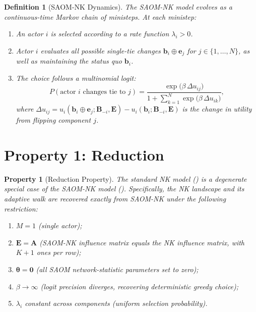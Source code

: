 \documentclass[12pt]{article}
\newtheorem{property}{Property}
\newtheorem{definition}{Definition}
\newcommand{\bb}{\mathbf{b}}
\newcommand{\be}{\mathbf{e}}
\newcommand{\bB}{\mathbf{B}}
\newcommand{\bA}{\mathbf{A}}
\newcommand{\bE}{\mathbf{E}}
\newcommand{\btheta}{\boldsymbol{\theta}}
\begin{document}
\begin{definition}[SAOM-NK Dynamics]
\label{def:saomnk_dynamics}
The SAOM-NK model evolves as a continuous-time Markov chain of \emph{ministeps}.
At each ministep:
\begin{enumerate}[label=(\roman*)]
  \item An actor $i$ is selected according to a rate function $\lambda_i > 0$.
  \item Actor $i$ evaluates all possible single-tie changes
        $\bb_i \oplus \be_j$ for $j \in \{1,\ldots,N\}$, as well as maintaining
        the status quo $\bb_i$.
  \item The choice follows a multinomial logit:
        \begin{equation}
        \label{eq:logit_choice}
          P(\text{actor } i \text{ changes tie to } j)
          = \frac{\exp\!\bigl(\beta\, \Delta u_{ij}\bigr)}
                 {\displaystyle 1 + \sum_{k=1}^{N}
                  \exp\!\bigl(\beta\, \Delta u_{ik}\bigr)},
        \end{equation}
        where $\Delta u_{ij} = u_i(\bb_i \oplus \be_j; \bB_{-i}, \bE) -
        u_i(\bb_i; \bB_{-i}, \bE)$ is the change in utility from flipping
        component $j$.
\end{enumerate}
\end{definition}

\section{Property 1: Reduction}
\label{sec:reduction}

\begin{property}[Reduction Property]
\label{property:reduction}
The standard NK model \emph{(}\emph{)} is a degenerate
special case of the SAOM-NK model \emph{(}\emph{)}. Specifically, the NK landscape and its adaptive
walk are recovered exactly from SAOM-NK under the following restriction:
\begin{enumerate}[label=(R\arabic*)]
  \item\label{R1} $M = 1$ (single actor);
  \item\label{R2} $\bE = \bA$ (SAOM-NK influence matrix equals the NK influence
        matrix, with $K+1$ ones per row);
  \item\label{R3} $\btheta = \mathbf{0}$ (all SAOM network-statistic parameters
        set to zero);
  \item\label{R4} $\beta \to \infty$ (logit precision diverges, recovering
        deterministic greedy choice);
  \item\label{R5} $\lambda_i$ constant across components (uniform selection
        probability).
\end{enumerate}
\end{property}
\end{document}
